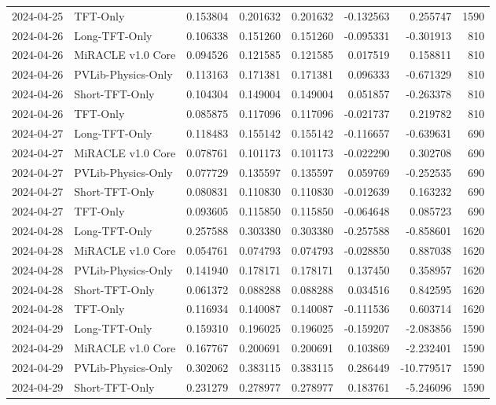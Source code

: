 \begin{tabular}{llrrrrrr}
2024-04-25 & TFT-Only & 0.153804 & 0.201632 & 0.201632 & -0.132563 & 0.255747 & 1590 \\
2024-04-26 & Long-TFT-Only & 0.106338 & 0.151260 & 0.151260 & -0.095331 & -0.301913 & 810 \\
2024-04-26 & MiRACLE v1.0 Core & 0.094526 & 0.121585 & 0.121585 & 0.017519 & 0.158811 & 810 \\
2024-04-26 & PVLib-Physics-Only & 0.113163 & 0.171381 & 0.171381 & 0.096333 & -0.671329 & 810 \\
2024-04-26 & Short-TFT-Only & 0.104304 & 0.149004 & 0.149004 & 0.051857 & -0.263378 & 810 \\
2024-04-26 & TFT-Only & 0.085875 & 0.117096 & 0.117096 & -0.021737 & 0.219782 & 810 \\
2024-04-27 & Long-TFT-Only & 0.118483 & 0.155142 & 0.155142 & -0.116657 & -0.639631 & 690 \\
2024-04-27 & MiRACLE v1.0 Core & 0.078761 & 0.101173 & 0.101173 & -0.022290 & 0.302708 & 690 \\
2024-04-27 & PVLib-Physics-Only & 0.077729 & 0.135597 & 0.135597 & 0.059769 & -0.252535 & 690 \\
2024-04-27 & Short-TFT-Only & 0.080831 & 0.110830 & 0.110830 & -0.012639 & 0.163232 & 690 \\
2024-04-27 & TFT-Only & 0.093605 & 0.115850 & 0.115850 & -0.064648 & 0.085723 & 690 \\
2024-04-28 & Long-TFT-Only & 0.257588 & 0.303380 & 0.303380 & -0.257588 & -0.858601 & 1620 \\
2024-04-28 & MiRACLE v1.0 Core & 0.054761 & 0.074793 & 0.074793 & -0.028850 & 0.887038 & 1620 \\
2024-04-28 & PVLib-Physics-Only & 0.141940 & 0.178171 & 0.178171 & 0.137450 & 0.358957 & 1620 \\
2024-04-28 & Short-TFT-Only & 0.061372 & 0.088288 & 0.088288 & 0.034516 & 0.842595 & 1620 \\
2024-04-28 & TFT-Only & 0.116934 & 0.140087 & 0.140087 & -0.111536 & 0.603714 & 1620 \\
2024-04-29 & Long-TFT-Only & 0.159310 & 0.196025 & 0.196025 & -0.159207 & -2.083856 & 1590 \\
2024-04-29 & MiRACLE v1.0 Core & 0.167767 & 0.200691 & 0.200691 & 0.103869 & -2.232401 & 1590 \\
2024-04-29 & PVLib-Physics-Only & 0.302062 & 0.383115 & 0.383115 & 0.286449 & -10.779517 & 1590 \\
2024-04-29 & Short-TFT-Only & 0.231279 & 0.278977 & 0.278977 & 0.183761 & -5.246096 & 1590 \\

\end{tabular}
